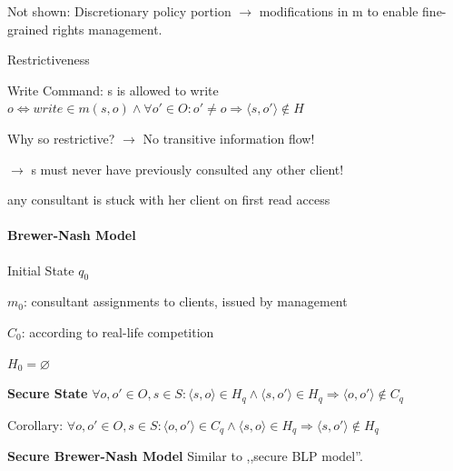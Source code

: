 \documentclass[a4paper]{article}
\renewcommand{\note}[2]{\begin{noteBox} \textbf{#1} #2 \end{noteBox}}
\begin{document}
\begin{multicols}{3}
    Not shown: Discretionary policy portion $\rightarrow$ modifications in m to enable fine-grained rights management.

    Restrictiveness
    \begin{itemize*}
        \item Write Command: s is allowed to write $o\Leftrightarrow write\in m(s,o)\wedge\forall o'\in O:o'\not=o\Rightarrow\langle s,o'\rangle \not\in H$
        \item Why so restrictive? $\rightarrow$ No transitive information flow!
        \item[$\rightarrow$] s must never have previously consulted any other client!
        \item any consultant is stuck with her client on first read access
    \end{itemize*}

    \paragraph{Brewer-Nash Model}
    \begin{itemize*}
        \item Initial State $q_0$
        \begin{itemize*}
            \item $m_0$: consultant assignments to clients, issued by management
            \item $C_0$: according to real-life competition
            \item $H_0 =\varnothing$
        \end{itemize*}
    \end{itemize*}

    \note{Secure State}{$\forall o,o' \in O,s\in S:\langle s,o\rangle \in H_q\wedge\langle s,o'\rangle \in H_q\Rightarrow\langle o,o'\rangle \not\in C_q$

        Corollary: $\forall o,o'\in O,s\in S:\langle o,o'\rangle \in C_q\wedge\langle s,o\rangle \in H_q\Rightarrow \langle s,o'\rangle \not\in H_q$
    }

    \note{Secure Brewer-Nash Model}{Similar to ,,secure BLP model''.}


\end{multicols}
\end{document}
